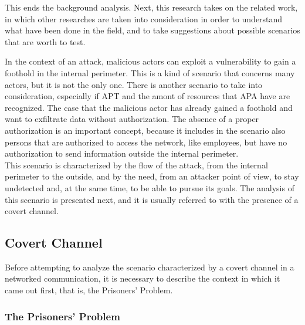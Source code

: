 \documentclass[12pt]{article}
\begin{document}
This ends the background analysis. Next, this research takes on the related work, in which other researches are taken into consideration in order to understand what have been done in the field, and to take suggestions 
about possible scenarios that are worth to test.













\pagebreak
In the context of an attack, malicious actors can exploit a vulnerability to gain a foothold in the internal perimeter. This is a kind of scenario that concerns many actors, but it is not the only one. There is another 
scenario to take into consideration, especially if APT and the amont of resources that APA have are recognized. The case that the malicious actor has already gained a foothold and want to exfiltrate data without 
authorization. The 
absence of a proper authorization is an important concept, because it includes in the scenario also persons that are authorized to access the network, like employees, but have no authorization to send information 
outside the internal perimeter.\\
This scenario is characterized by the flow of the attack, from the internal perimeter to the outside, and by the need, from an attacker point of view, to stay undetected and, at the same time, to be able to pursue its goals. 
The analysis of this scenario is presented next, and it is usually referred to with the presence of a covert channel.

\subsection{Covert Channel}
\label{sub:covert}

Before attempting to analyze the scenario characterized by a covert channel in a networked communication, it is necessary to describe the context in which it came out first, that is, the Prisoners' Problem.

\subsubsection{The Prisoners' Problem}
\label{subsub:prisoners}
\end{document}
